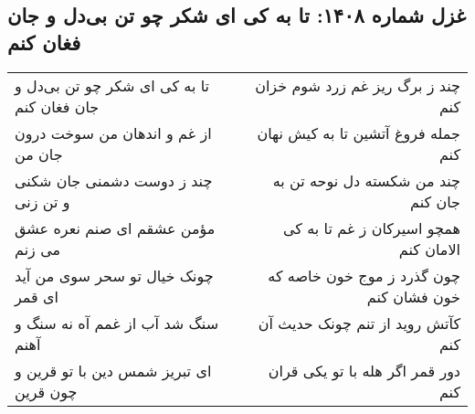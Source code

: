 \begin{center}
\section*{غزل شماره ۱۴۰۸: تا به کی ای شکر چو تن بی‌دل و جان فغان کنم}
\label{sec:1408}
\begin{longtable}{l p{0.5cm} r}
تا به کی ای شکر چو تن بی‌دل و جان فغان کنم
&&
چند ز برگ ریز غم زرد شوم خزان کنم
\\
از غم و اندهان من سوخت درون جان من
&&
جمله فروغ آتشین تا به کیش نهان کنم
\\
چند ز دوست دشمنی جان شکنی و تن زنی
&&
چند من شکسته دل نوحه تن به جان کنم
\\
مؤمن عشقم ای صنم نعره عشق می زنم
&&
همچو اسیرکان ز غم تا به کی الامان کنم
\\
چونک خیال تو سحر سوی من آید ای قمر
&&
چون گذرد ز موج خون خاصه که خون فشان کنم
\\
سنگ شد آب از غمم آه نه سنگ و آهنم
&&
کآتش روید از تنم چونک حدیث آن کنم
\\
ای تبریز شمس دین با تو قرین و چون قرین
&&
دور قمر اگر هله با تو یکی قران کنم
\\
\end{longtable}
\end{center}

